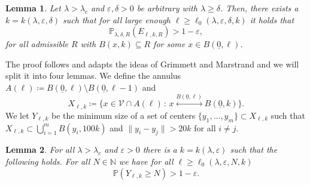 \documentclass[11pt]{article}%
\newtheorem{lemma}[lemma]{Lemma}
\newcommand{\eps}{\varepsilon}
\newcommand{\NN}{\mathbb{N}}
\newcommand{\Pro}{\mathbb{P}}
\newcommand{\typ}{\underline{0}}
\begin{document}
\begin{lemma}\label{ABlongconnection}
	Let $ \lambda>\lambda_c $ and $ \eps,\delta>0 $ be arbitrary with $ \lambda\geq \delta $. Then, there exists a $ k=k(\lambda,\eps,\delta) $ such that for all large enough
	$ \ell\geq\ell_0(\lambda,\eps,\delta,k) $ it holds that
	\begin{equation*}
		\Pro_{\lambda,\delta,R}(E_{\ell,k,R})>1-\eps,
	\end{equation*}
   for all admissible $ R $ with $B(x,k) \subseteq R $ for some $ x\in B(\typ,\ell) $.
\end{lemma}
The proof follows and adapts the ideas of Grimmett and Marstrand \cite{GrimmettMarstrand1990Supercritical} and we will split it into four lemmas. We define the annulus $ A(\ell)\coloneqq  B(\typ,\ell)\setminus B(\typ,\ell-1)$ and
\begin{equation*}
	X_{\ell,k}\coloneqq\{x\in \mathcal{V}\cap A(\ell)\,:\, x\stackrel{B(\typ,\ell)}{\longleftrightarrow} B(\typ,k)\}.
\end{equation*}
We let $Y_{\ell,k}$ be the minimum size of a set of centers $\{y_1,\dots,y_m\}\subset X_{\ell,k}$
such that $X_{\ell,k}\subset \bigcup_{i=1}^m B(y_i,100k)$ and $\|y_i-y_j\|>20k$ for all $i\ne j$.
\begin{lemma}\label{l1}
	For all $ \lambda>\lambda_c $ and $ \eps>0 $ there is a $ k=k(\lambda,\eps) $ such that the following holds. For all $ N\in \NN $ we have for all $\ell\geq \ell_0(\lambda,\eps,N,k) $
	\begin{equation*}
		\Pro(Y_{\ell,k}\geq N)>1-\eps.
	\end{equation*} 
\end{lemma}
\end{document}

